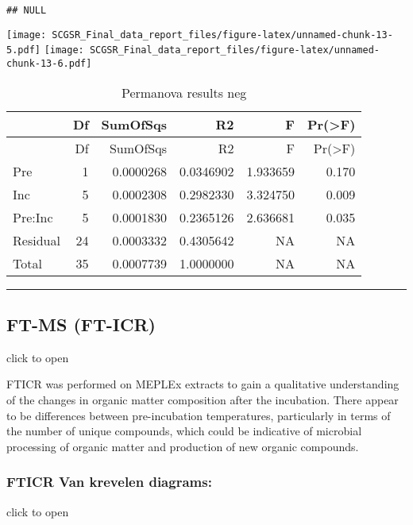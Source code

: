 \documentclass[
]{article}
\begin{document}
\begin{verbatim}
## NULL
\end{verbatim}

\texttt{[image: SCGSR\_Final\_data\_report\_files/figure-latex/unnamed-chunk-13-5.pdf]}
\texttt{[image: SCGSR\_Final\_data\_report\_files/figure-latex/unnamed-chunk-13-6.pdf]}

\begin{longtable}[]{@{}lrrrrr@{}}
\caption{Permanova results neg}\tabularnewline
\toprule()
& Df & SumOfSqs & R2 & F & Pr(\textgreater F) \\
\midrule()
\endfirsthead
\toprule()
& Df & SumOfSqs & R2 & F & Pr(\textgreater F) \\
\midrule()
\endhead
Pre & 1 & 0.0000268 & 0.0346902 & 1.933659 & 0.170 \\
Inc & 5 & 0.0002308 & 0.2982330 & 3.324750 & 0.009 \\
Pre:Inc & 5 & 0.0001830 & 0.2365126 & 2.636681 & 0.035 \\
Residual & 24 & 0.0003332 & 0.4305642 & NA & NA \\
Total & 35 & 0.0007739 & 1.0000000 & NA & NA \\
\bottomrule()
\end{longtable}

\begin{center}\rule{0.5\linewidth}{0.5pt}\end{center}

\hypertarget{ft-ms-ft-icr}{%
\subsection{FT-MS (FT-ICR)}\label{ft-ms-ft-icr}}

click to open

FTICR was performed on MEPLEx extracts to gain a qualitative
understanding of the changes in organic matter composition after the
incubation. There appear to be differences between pre-incubation
temperatures, particularly in terms of the number of unique compounds,
which could be indicative of microbial processing of organic matter and
production of new organic compounds.

\hypertarget{fticr-van-krevelen-diagrams}{%
\subsubsection{FTICR Van krevelen
diagrams:}\label{fticr-van-krevelen-diagrams}}

click to open
\end{document}
